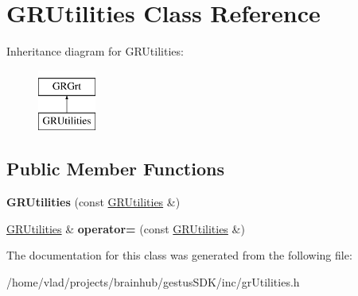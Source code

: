 \hypertarget{classGRUtilities}{}\section{G\+R\+Utilities Class Reference}
\label{classGRUtilities}
Inheritance diagram for G\+R\+Utilities\+:\begin{figure}[H]
\begin{center}
\leavevmode
\includegraphics[height=2.000000cm]{classGRUtilities}
\end{center}
\end{figure}
\subsection*{Public Member Functions}
\begin{DoxyCompactItemize}
\item 
\mbox{\label{classGRUtilities_a0d5634b33b4356e446d2ab1ef7a3f749}} 
{\bfseries G\+R\+Utilities} (const \mbox{\hyperlink{classGRUtilities}{G\+R\+Utilities}} \&)
\item 
\mbox{\label{classGRUtilities_a12f50039407684c56b4ece2c6f48aad4}} 
\mbox{\hyperlink{classGRUtilities}{G\+R\+Utilities}} \& {\bfseries operator=} (const \mbox{\hyperlink{classGRUtilities}{G\+R\+Utilities}} \&)
\end{DoxyCompactItemize}


The documentation for this class was generated from the following file\+:\begin{DoxyCompactItemize}
\item 
/home/vlad/projects/brainhub/gestus\+S\+D\+K/inc/gr\+Utilities.\+h\end{DoxyCompactItemize}
